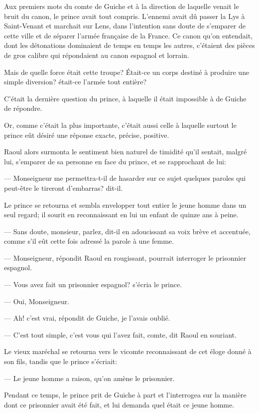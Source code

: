 Aux premiers mots du comte de Guiche et à la direction de laquelle venait le bruit du canon, le prince avait tout compris. L'ennemi avait dû passer la Lys à Saint-Venant et marchait sur Lens, dans l'intention sans doute de s'emparer de cette ville et de séparer l'armée française de la France. Ce canon qu'on entendait, dont les détonations dominaient de temps en temps les autres, c'étaient des pièces de gros calibre qui répondaient au canon espagnol et lorrain.

Mais de quelle force était cette troupe? Était-ce un corps destiné à produire une simple diversion? était-ce l'armée tout entière?

C'était la dernière question du prince, à laquelle il était impossible à de Guiche de répondre.

Or, comme c'était la plus importante, c'était aussi celle à laquelle surtout le prince eût désiré une réponse exacte, précise, positive.

Raoul alors surmonta le sentiment bien naturel de timidité qu'il sentait, malgré lui, s'emparer de sa personne en face du prince, et se rapprochant de lui:

— Monseigneur me permettra-t-il de hasarder sur ce sujet quelques paroles qui peut-être le tireront d'embarras? dit-il.

Le prince se retourna et sembla envelopper tout entier le jeune homme dans un seul regard; il sourit en reconnaissant en lui un enfant de quinze ans à peine.

— Sans doute, monsieur, parlez, dit-il en adoucissant sa voix brève et accentuée, comme s'il eût cette fois adressé la parole à une femme.

— Monseigneur, répondit Raoul en rougissant, pourrait interroger le prisonnier espagnol.

— Vous avez fait un prisonnier espagnol? s'écria le prince.

— Oui, Monseigneur.

— Ah! c'est vrai, répondit de Guiche, je l'avais oublié.

— C'est tout simple, c'est vous qui l'avez fait, comte, dit Raoul en souriant.

Le vieux maréchal se retourna vers le vicomte reconnaissant de cet éloge donné à son fils, tandis que le prince s'écriait:

— Le jeune homme a raison, qu'on amène le prisonnier.

Pendant ce temps, le prince prit de Guiche à part et l'interrogea sur la manière dont ce prisonnier avait été fait, et lui demanda quel était ce jeune homme.

